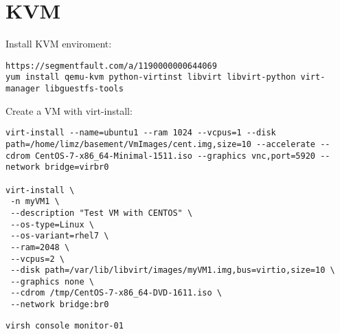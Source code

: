 \section{KVM}

Install KVM enviroment:
\begin{verbatim}
https://segmentfault.com/a/1190000000644069
yum install qemu-kvm python-virtinst libvirt libvirt-python virt-manager libguestfs-tools
\end{verbatim}

Create a VM with virt-install:
\begin{verbatim}
virt-install --name=ubuntu1 --ram 1024 --vcpus=1 --disk path=/home/limz/basement/VmImages/cent.img,size=10 --accelerate --cdrom CentOS-7-x86_64-Minimal-1511.iso --graphics vnc,port=5920 --network bridge=virbr0

virt-install \
 -n myVM1 \
 --description "Test VM with CENTOS" \
 --os-type=Linux \
 --os-variant=rhel7 \
 --ram=2048 \
 --vcpus=2 \
 --disk path=/var/lib/libvirt/images/myVM1.img,bus=virtio,size=10 \
 --graphics none \
 --cdrom /tmp/CentOS-7-x86_64-DVD-1611.iso \
 --network bridge:br0
\end{verbatim}


\begin{verbatim}
virsh console monitor-01
\end{verbatim}



